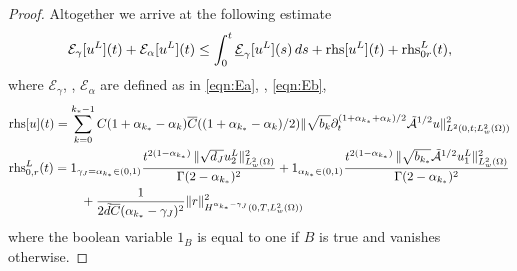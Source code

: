 \begin{proof}
Altogether we arrive at the following estimate 
\begin{equation}\label{eqn:enest0}
\mathcal{E}_\gamma[u^L](t)+\mathcal{E}_\alpha[u^L](t)\leq 
{\int_0^t \underline{\mathcal{E}}_\gamma[u^L](s)\, ds} 
+\mbox{rhs}[u^L](t) + 
\mbox{rhs}^L_{0r}(t),
\end{equation}
where $\mathcal{E}_\gamma$, , $\mathcal{E}_\alpha$ are defined as in \eqref{eqn:Ea}, \rerevision{\eqref{eqn:ulEa}}, \eqref{eqn:Eb},
\[
\begin{aligned}
&\mbox{rhs}[u](t)=
\sum_{k=0}^{k_*-1}C(1+\alpha_{k_*}-\alpha_k)\overline{C}((1+\alpha_{k_*}-\alpha_k)/2)\|\sqrt{b_k}\partial_t^{(1+\alpha_{k_*}+\alpha_k)/2}\tilde{\mathcal{A}}^{1/2}u\|_{L^2(0,t;L^2_w(\Omega))}^2\\
&\mbox{rhs}^L_{0,r}(t)=
1_{\gamma_J=\alpha_{k_*}\in(0,1)} \frac{t^{2(1-\alpha_{k_*})}\,\|\sqrt{d_J}u_2^L\|_{L^2_w(\Omega)}^2}{\Gamma(2-\alpha_{k_*})^2}
+1_{\alpha_{k_*}\in(0,1)} \frac{t^{2(1-\alpha_{k_*})}\,\|\sqrt{b_{k_*}}\tilde{\mathcal{A}}^{1/2}u_1^L\|_{L^2_w(\Omega)}^2}{\Gamma(2-\alpha_{k_*})^2}\\
&\hspace*{2cm}+\frac{1}{2\tilde{d}\overline{C}(\alpha_{k_*}-\gamma_J)^2} \|r\|_{H^{\alpha_{k_*}-\gamma_J}(0,T,L^2_w(\Omega))}^2
\end{aligned}
\]
where the boolean variable $1_B$ is equal to one if $B$ is true and vanishes otherwise.


\end{proof}
